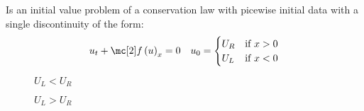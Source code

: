 \begin{defnbox}\nospacing
    \begin{defn}\label{defn:riemann_problem}
        Is an initial value problem of a conservation law with
        picewise initial data with a single discontinuity of the form:\\
        \begin{align}
        u_{t}+\flux \left(u\right)_{x}=0&&
        u_{0}=\begin{cases}
                U_{R}&\text{if }x>0\\
                U_{L}&\text{if }x<0
                \end{cases}
        \end{align}
        \begin{minipage}{0.49\textwidth}
            \begin{figure}[H]
                \centering{
                  \def\svgwidth{100pt}
                  \resizebox{\linewidth}{!}{}
                }
                \caption{$U_{L}<U_{R}$}
            \end{figure}
        \end{minipage}\hfil
        \begin{minipage}[c]{0.49\textwidth}
            \begin{figure}[H]
                \centering{
                  \def\svgwidth{100pt}
                  \resizebox{\linewidth}{!}{}
                }
                \caption{$U_{L}>U_{R}$}
            \end{figure}
        \end{minipage}
    \end{defn}
\end{defnbox}

